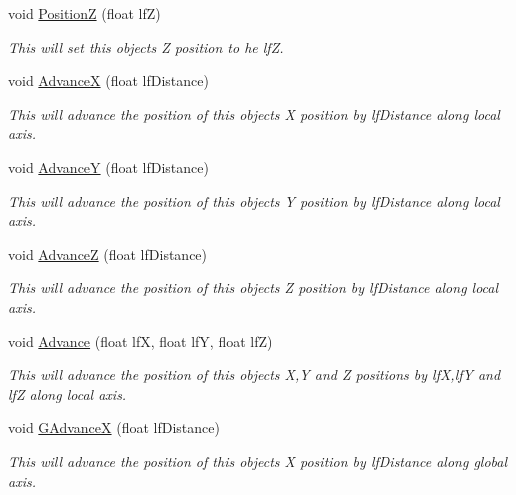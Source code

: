 \begin{DoxyCompactItemize}
void \hyperlink{classc_camera_matrix4_a6ea814a92ce2d7fcc1ba66490127b2f2}{PositionZ} (float lfZ)
\begin{DoxyCompactList}\small\item\em This will set this objects Z position to he lfZ. \item\end{DoxyCompactList}\item 
void \hyperlink{classc_camera_matrix4_a4a07cdf5cb578378193487a1ac304380}{AdvanceX} (float lfDistance)
\begin{DoxyCompactList}\small\item\em This will advance the position of this objects X position by lfDistance along local axis. \item\end{DoxyCompactList}\item 
void \hyperlink{classc_camera_matrix4_a1c644144c6673fad0d45ac2a28065edb}{AdvanceY} (float lfDistance)
\begin{DoxyCompactList}\small\item\em This will advance the position of this objects Y position by lfDistance along local axis. \item\end{DoxyCompactList}\item 
void \hyperlink{classc_camera_matrix4_a18915056c461b31b5ea916715fa2582f}{AdvanceZ} (float lfDistance)
\begin{DoxyCompactList}\small\item\em This will advance the position of this objects Z position by lfDistance along local axis. \item\end{DoxyCompactList}\item 
void \hyperlink{classc_camera_matrix4_acd0e691c270f18c80965bf8da4442d5b}{Advance} (float lfX, float lfY, float lfZ)
\begin{DoxyCompactList}\small\item\em This will advance the position of this objects X,Y and Z positions by lfX,lfY and lfZ along local axis. \item\end{DoxyCompactList}\item 
void \hyperlink{classc_camera_matrix4_a69ef5c53bd239d2f1041ac9330c2cc08}{GAdvanceX} (float lfDistance)
\begin{DoxyCompactList}\small\item\em This will advance the position of this objects X position by lfDistance along global axis. \item\end{DoxyCompactList}\item 

\end{DoxyCompactItemize}

